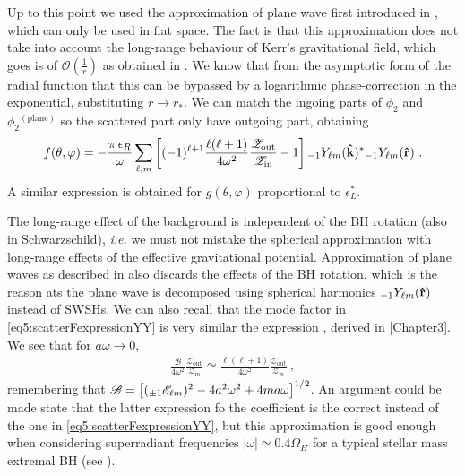 Up to this point we used the approximation of plane wave first introduced in , which can only be used in flat space. The fact is that this approximation does not take into account the long-range behaviour of Kerr's gravitational field, which goes is of $\mathscr{O}(\tfrac{1}{r})$ as obtained in .
We know that from the asymptotic form of the radial function that this can be bypassed by a logarithmic phase-correction in the exponential, substituting $r\to r_{*}$.
We can match the ingoing parts of $\phi_2$ and $\phi_2{}^{(\mathrm{plane})}$ so the scattered part only have outgoing part, obtaining
\begin{align}
    \label{eq5:scatterFexpressionYY}
    f(\theta,\varphi) = - \frac{\pi \,\epsilon_R}{\omega} \sum_{\ell,m} \left[
    (-1)^{\ell+1} \frac{\ell(\ell+1)}{4 \omega^2 }
    \frac{\mathscr{Z}_\mathrm{out}}{\mathscr{Z}_\mathrm{in}} - 1 \right]
    \uu[-1]{Y}{\ell m}(\mathbf{\hat{k}})^{*} \uu[-1]{Y}{\ell m}(\mathbf{\hat{r}}) ~.
\end{align}
A similar expression is obtained for $g(\theta,\varphi)$ proportional to $\epsilon_L^*$.

The long-range effect of the background is independent of the BH rotation (also in Schwarzschild), \emph{i.e.} we must not mistake the spherical approximation with long-range effects of the effective gravitational potential.
Approximation of plane waves as described in  also discards the effects of the BH rotation, which is the reason ats the plane wave is decomposed using spherical harmonics $\uu[-1]{Y}{\ell m}(\mathbf{\hat{r}})$ instead of SWSHs.
We can also recall that the mode factor in \eqref{eq5:scatterFexpressionYY} is very similar the expression , derived in \cref{Chapter3}.
We see that for $a\omega \to 0$,
\begin{align}
    \label{eq5:phaseFactor}
    \frac{\mathscr{B}}{4 \omega^2} \frac{\mathscr{Z}_\mathrm{out}}{\mathscr{Z}_\mathrm{in}} \simeq \frac{\ell(\ell+1)}{4 \omega^2} \frac{\mathscr{Z}_\mathrm{out}}{\mathscr{Z}_\mathrm{in}} ~,
\end{align}
remembering that $\mathscr{B} = \left[ (\uu[\pm 1]{\mathscr{E}}{\ell m})^2 - 4 a^2 \omega^2 + 4 m a \omega \right]^{1/2}$.
An argument could be made state that the latter expression fo the coefficient is the correct instead of the one in \eqref{eq5:scatterFexpressionYY}, but this approximation is good enough when considering superradiant frequencies $|\omega| \simeq 0.4 \Omega_H$ for a typical stellar mass extremal BH (see ).

